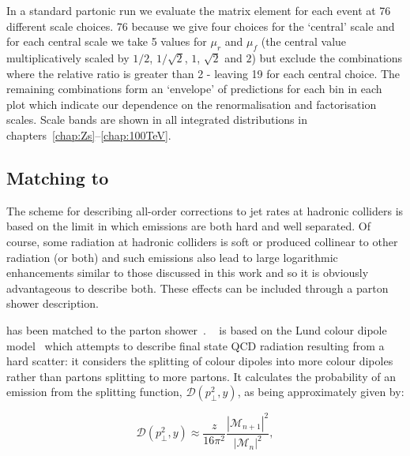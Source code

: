		In a standard partonic \HEJ
		run we evaluate the matrix element for each event at 76 different scale choices.  76
		because we give four choices for the `central' scale and for each central scale we take 5
		values for $\mu_r$ and $\mu_f$ (the central value multiplicatively scaled by $1/2$, $1/\sqrt{2}$,
		$1$, $\sqrt{2}$ and $2$) but exclude the combinations where the relative ratio is greater
		than 2 - leaving 19 for each central choice.  The remaining combinations form an `envelope' of
		predictions for each bin in each plot which indicate our dependence on the renormalisation and
		factorisation scales.  Scale bands are shown in all integrated distributions in chapters~\ref{chap:Zs}--\ref{chap:100TeV}.

	\subsection{Matching to \ARIADNE}

		The \HEJ scheme for describing all-order corrections to jet rates at hadronic colliders
		is based on the limit in which emissions are both hard and well separated.  Of course, some
		radiation at hadronic colliders is soft or produced collinear to other radiation (or both) and
		such emissions also lead to large logarithmic enhancements similar to those discussed in this
		work and so it is obviously advantageous to describe both.  These effects can be included through a parton shower description.


		\HEJ has been matched to the \ARIADNE parton shower~\cite{Andersen:2011zd}.  \ARIADNE~\cite{Lonnblad:1992tz}
		is based on the Lund colour dipole model~\cite{Gustafson:180791} which attempts to describe final state QCD
		radiation resulting from a hard scatter: it considers the splitting of colour dipoles into more colour
		dipoles rather than partons splitting to more partons.  It calculates the probability of an emission from
		the splitting function, $\mathcal{D}(p_\perp^2, y)$, as being approximately given by:

		\begin{equation}
			\mathcal{D}(p_\perp^2, y) \approx \frac{z}{16\pi^2}
			\frac{|\mathcal{M}_{n+1}|^2}{|\mathcal{M}_{n}|^2},
		\end{equation}

